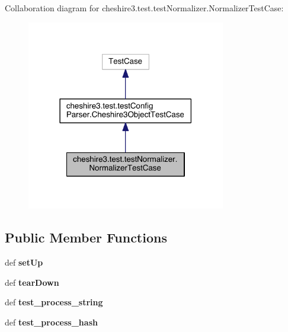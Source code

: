 Collaboration diagram for cheshire3.\-test.\-test\-Normalizer.\-Normalizer\-Test\-Case\-:
\nopagebreak
\begin{figure}[H]
\begin{center}
\leavevmode
\includegraphics[width=246pt]{classcheshire3_1_1test_1_1test_normalizer_1_1_normalizer_test_case__coll__graph}
\end{center}
\end{figure}
\subsection*{Public Member Functions}
\begin{DoxyCompactItemize}
\item 
\hypertarget{classcheshire3_1_1test_1_1test_normalizer_1_1_normalizer_test_case_ad8459ca6371dfc8345e9e61111304951}{def {\bfseries set\-Up}}\label{classcheshire3_1_1test_1_1test_normalizer_1_1_normalizer_test_case_ad8459ca6371dfc8345e9e61111304951}

\item 
\hypertarget{classcheshire3_1_1test_1_1test_normalizer_1_1_normalizer_test_case_ac03fe3025e66f39175f9a9b3f954976f}{def {\bfseries tear\-Down}}\label{classcheshire3_1_1test_1_1test_normalizer_1_1_normalizer_test_case_ac03fe3025e66f39175f9a9b3f954976f}

\item 
\hypertarget{classcheshire3_1_1test_1_1test_normalizer_1_1_normalizer_test_case_a46674f766b0dbcbc39c2b481c5bbe97d}{def {\bfseries test\-\_\-process\-\_\-string}}\label{classcheshire3_1_1test_1_1test_normalizer_1_1_normalizer_test_case_a46674f766b0dbcbc39c2b481c5bbe97d}

\item 
\hypertarget{classcheshire3_1_1test_1_1test_normalizer_1_1_normalizer_test_case_af79900efb27e6aff2e3b26ab7fc7b404}{def {\bfseries test\-\_\-process\-\_\-hash}}\label{classcheshire3_1_1test_1_1test_normalizer_1_1_normalizer_test_case_af79900efb27e6aff2e3b26ab7fc7b404}

\end{DoxyCompactItemize}
